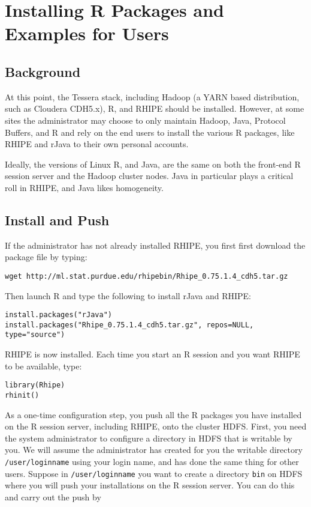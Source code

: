\section{Installing R Packages and Examples for Users}
\subsection{Background}

At this point, the Tessera stack, including Hadoop (a YARN based
distribution, such as Cloudera CDH5.x), R, and RHIPE should be installed.
However, at some sites the administrator may choose to only maintain
Hadoop, Java, Protocol Buffers, and R and rely on the end users to
install the various R packages, like RHIPE and rJava to their own
personal accounts.

Ideally, the versions of Linux R, and Java, are the same on both the
front-end R session server and the Hadoop cluster nodes.  Java in particular
plays a critical roll in RHIPE, and Java likes homogeneity.

\subsection{Install and Push}
If the administrator has not already installed RHIPE, you first
first download the package file by typing:

\begin{verbatim}
wget http://ml.stat.purdue.edu/rhipebin/Rhipe_0.75.1.4_cdh5.tar.gz
\end{verbatim}

Then launch R and type the following to install rJava and RHIPE:

\begin{verbatim}
install.packages("rJava")
install.packages("Rhipe_0.75.1.4_cdh5.tar.gz", repos=NULL, type="source")
\end{verbatim}

RHIPE is now installed. Each time you start an R session and you
want RHIPE to be available, type:

\begin{verbatim}
library(Rhipe)
rhinit()
\end{verbatim}

As a one-time configuration step, you push all the R packages you have
installed on the R session server, including RHIPE, onto the cluster HDFS.
First, you need the system administrator to configure a directory in HDFS
that is writable by you. We will assume the administrator has created
for you the writable directory \texttt{/user/loginname} using your
login name, and has done the same thing for other users.  Suppose in
\texttt{/user/loginname} you want to create a directory \texttt{bin}
on HDFS where you will push your installations on the R session
server. You can do this and carry out the push by

